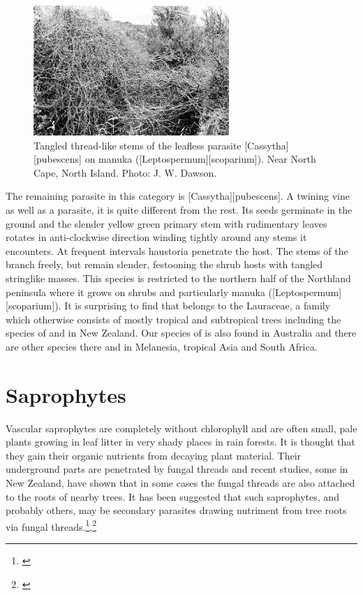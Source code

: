 \begin{figure}
	\includegraphics[width=0.66\textwidth]{graphics/figure59cassytha.jpg}
	\centering
	\caption[Tangled thread-like stems of the leafless parasite \emph{Cassytha pubescens}]{Tangled thread-like stems of the leafless parasite [Cassytha][pubescens] on manuka ([Leptospermum][scoparium]).
	Near North Cape, North Island.
	Photo: J. W. Dawson.}%
	\label{fig:59cassytha}
\end{figure}

The remaining parasite in this category is [Cassytha][pubescens].
A twining vine as well as a parasite, it is quite different from the rest.
Its seeds germinate in the ground and the slender yellow green primary stem with rudimentary leaves rotates in anti-clockwise direction winding tightly around any stems it encounters.
At frequent intervals haustoria penetrate the host.
The stems of the  branch freely, but remain slender, festooning the shrub hosts with tangled stringlike masses.
This species is restricted to the northern half of the Northland peninsula where it grows on shrubs and particularly manuka ([Leptospermum][scoparium]).
It is surprising to find that  belongs to the Lauraceae, a family which otherwise consists of mostly tropical and subtropical trees including the species of  and  in New Zealand.
Our species of  is also found in Australia and there are other species there and in Melanesia, tropical Asia and South Africa.

\section{Saprophytes}

Vascular saprophytes are completely without chlorophyll and are often small, pale plants growing in leaf litter in very shady places in rain forests.
It is thought that they gain their organic nutrients from decaying plant material.
Their underground parts are penetrated by fungal threads and recent studies, some in New Zealand, have shown that in some cases the fungal threads are also attached to the roots of nearby trees.
It has been suggested that such saprophytes, and probably others, may be secondary parasites drawing nutriment from tree roots via fungal threads.\footnote{\cite{campbell1962mycorrhiza}},\footnote{\cite{campbell1968investigation}}


